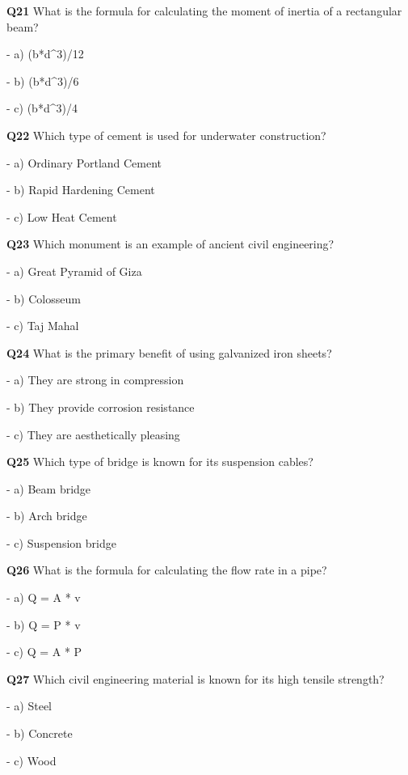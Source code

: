 \textbf{Q21} What is the formula for calculating the moment of inertia of a rectangular beam?\par
\quad - a) (b*d^3)/12\par
\quad - b) (b*d^3)/6\par
\quad - c) (b*d^3)/4\par

\textbf{Q22} Which type of cement is used for underwater construction?\par
\quad - a) Ordinary Portland Cement\par
\quad - b) Rapid Hardening Cement\par
\quad - c) Low Heat Cement\par

\textbf{Q23} Which monument is an example of ancient civil engineering?\par
\quad - a) Great Pyramid of Giza\par
\quad - b) Colosseum\par
\quad - c) Taj Mahal\par

\textbf{Q24} What is the primary benefit of using galvanized iron sheets?\par
\quad - a) They are strong in compression\par
\quad - b) They provide corrosion resistance\par
\quad - c) They are aesthetically pleasing\par

\textbf{Q25} Which type of bridge is known for its suspension cables?\par
\quad - a) Beam bridge\par
\quad - b) Arch bridge\par
\quad - c) Suspension bridge\par

\textbf{Q26} What is the formula for calculating the flow rate in a pipe?\par
\quad - a) Q = A * v\par
\quad - b) Q = P * v\par
\quad - c) Q = A * P\par

\textbf{Q27} Which civil engineering material is known for its high tensile strength?\par
\quad - a) Steel\par
\quad - b) Concrete\par
\quad - c) Wood\par


